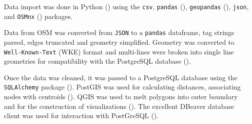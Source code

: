 Data import was done in Python (\cite{python}) using the \texttt{csv}, \texttt{pandas} (\cite{pandas}), \texttt{geopandas} (\cite{geopandas}), \texttt{json}, and \texttt{OSMnx} (\cite{osmnx}) packages. 

Data from OSM was converted from \texttt{JSON} to a \texttt{pandas} dataframe, tag strings parsed, edges truncated and geometry simplified. Geometry was converted to \texttt{Well-Known-Text} (WKE) format and multi-lines were broken into single line geometries for compatibility with the PostgreSQL database (\cite{postgres}). 

Once the data was cleaned, it was passed to a PostgreSQL database using the \texttt{SQLAlchemy} package (\cite{bayer2010sqlalchemy}). PostGIS was used for calculating distances, associating nodes with centroids (\cite{postgis}). QGIS was used to melt polygons into outer boundary and for the construction of visualizations (\cite{qgis}). The excellent DBeaver database client was used for interaction with PostGreSQL (\cite{dbeaver}).